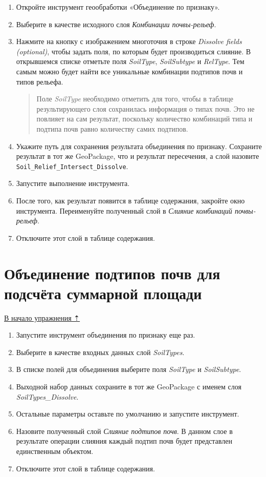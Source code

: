 \documentclass[
  12pt,
]{book}
\begin{document}
\begin{enumerate}
\def\labelenumi{\arabic{enumi}.}
\item
  Откройте инструмент геообработки «Объединение по признаку».
\item
  Выберите в качестве исходного слоя \emph{Комбинации почвы-рельеф}.
\item
  Нажмите на кнопку с изображением многоточия в строке \emph{Dissolve fields (optional)}, чтобы задать поля, по которым будет производиться слияние. В открывшемся списке отметьте поля \emph{SoilType}, \emph{SoilSubtype} и \emph{RelType}. Тем самым можно будет найти все уникальные комбинации подтипов почв и типов рельефа.

  \begin{quote}
  Поле \emph{SoilType} необходимо отметить для того, чтобы в таблице результирующего слоя сохранилась информация о типах почв. Это не повлияет на сам результат, поскольку количество комбинаций типа и подтипа почв равно количеству самих подтипов.
  \end{quote}
\item
  Укажите путь для сохранения результата объединения по признаку. Сохраните результат в тот же GeoPackage, что и результат пересечения, а слой назовите \texttt{Soil\_Relief\_Intersect\_Dissolve}.
\item
  Запустите выполнение инструмента.
\item
  После того, как результат появится в таблице содержания, закройте окно инструмента. Переименуйте полученный слой в \emph{Слияние комбинаций почвы-рельеф}.
\item
  Отключите этот слой в таблице содержания.
\end{enumerate}

\hypertarget{overlay-sumarea-subtypes}{%
\section{Объединение подтипов почв для подсчёта суммарной площади}\label{overlay-sumarea-subtypes}}

\protect\hyperlink{overlay}{В начало упражнения ⇡}

\begin{enumerate}
\def\labelenumi{\arabic{enumi}.}
\item
  Запустите инструмент объединения по признаку еще раз.
\item
  Выберите в качестве входных данных слой \emph{SoilTypes}.
\item
  В списке полей для объединения выберите поля \emph{SoilType} и \emph{SoilSubtype}.
\item
  Выходной набор данных сохраните в тот же GeoPackage с именем слоя \emph{SoilTypes\_Dissolve}.
\item
  Остальные параметры оставьте по умолчанию и запустите инструмент.
\item
  Назовите полученный слой \emph{Слияние подтипов почв}. В данном слое в результате операции слияния каждый подтип почв будет представлен единственным объектом.
\item
  Отключите этот слой в таблице содержания.
\end{enumerate}
\end{document}
